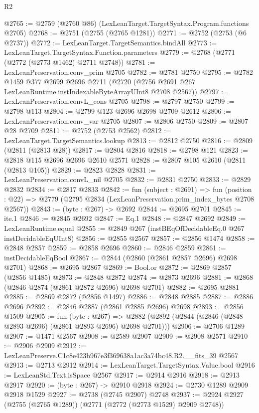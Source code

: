 \begin{lexlean}{R2}
\begin{coremodule}
@2765 := @2759 (@2760 @86) (LexLeanTarget.TargetSyntax.Program.functions @2705)
@2768 := @2751 (@2755 (@2765 @1281))
@2771 := @2752 (@2753 (@6 @2737))
@2772 := LexLeanTarget.TargetSemantics.bindAll
@2773 := LexLeanTarget.TargetSyntax.Function.parameters
@2779 := @2768 (@2771 (@2772 (@2773 @1462) @2711 @2748))
@2781 := LexLeanPreservation.conv_prim @2705
@2782 := @2781 @2750
@2795 := @2782
    @1459
    @377
    @2699
    @2696
    @2711
    (@2720 (@2756 @2691 @267 LexLeanRuntime.instIndexableByteArrayUInt8 @2708 @2567))
@2797 := LexLeanPreservation.convL_cons @2705
@2798 := @2797 @2750
@2799 := @2798 @113
@2804 := @2799 @123 @2696 @2698 @2709 @2612
@2806 := LexLeanPreservation.conv_var @2705
@2807 := @2806 @2750
@2809 := @2807 @28 @2709
@2811 := @2752 (@2753 @2562)
@2812 := LexLeanTarget.TargetSemantics.lookup
@2813 := @2812 @2750
@2816 := @2809 (@2811 (@2813 @28))
@2817 := @2804 @2816
@2818 := @2798 @121
@2823 := @2818 @115 @2696 @2696 @2610 @2571
@2828 := @2807 @105 @2610 (@2811 (@2813 @105))
@2829 := @2823 @2828
@2831 := LexLeanPreservation.convL_nil @2705
@2832 := @2831 @2750
@2833 := @2829 @2832
@2834 := @2817 @2833
@2842 := fun (subject : @2691) =>
  fun (position : @22) => @2779 (@2795 @2834 (LexLeanPreservation.prim_index_bytes @2708 @2567))
@2843 := (byte : @267) -> @2692
@2844 := @2695 @2701
@2845 := ite.{1}
@2846 := @2845 @2692
@2847 := Eq.{1}
@2848 := @2847 @2692
@2849 := LexLeanRuntime.equal
@2855 := @2849 @267 (instBEqOfDecidableEq.{0} @267 instDecidableEqUInt8)
@2856 := @2855 @2567
@2857 := @2856 @1474
@2858 := @2848 @2857
@2859 := @2858 @2696
@2860 := @2846 @2859
@2861 := instDecidableEqBool
@2867 := @2844 (@2860 (@2861 @2857 @2696) @2698 @2701)
@2868 := @2695 @2867
@2869 := Bool.or
@2872 := @2869 @2857 (@2856 @1485)
@2873 := @2848 @2872
@2874 := @2873 @2696
@2881 := @2868 (@2846 @2874 (@2861 @2872 @2696) @2698 @2701)
@2882 := @2695 @2881
@2885 := @2869 @2872 (@2856 @1497)
@2886 := @2848 @2885
@2887 := @2886 @2696
@2892 := @2846 @2887 (@2861 @2885 @2696) @2698
@2893 := @2856 @1509
@2905 := fun (byte : @267) =>
  @2882 (@2892 (@2844 (@2846 (@2848 @2893 @2696) (@2861 @2893 @2696) @2698 @2701)))
@2906 := @2706 @1289
@2907 := @1471 @2567
@2908 := @2589 @2907
@2909 := @2908 @2571
@2910 := @2906 @2909
@2912 := LexLeanPreserve.C1c8e423b967e3f369638a1ac3a74bc48.R2.__fits_39 @2567
@2913 := @2713 @2912
@2914 := LexLeanTarget.TargetSyntax.Value.bool
@2916 := LexLeanStd.Text.isSpace @2567
@2917 := @2914 @2916
@2918 := @2913 @2917
@2920 := (byte : @267) -> @2910 @2918
@2924 := @2730 @1289 @2909 @2918 @1529
@2927 := @2738 (@2745 @2907) @2748
@2937 := @2924 @2927 (@2755 (@2765 @1289)) (@2771 (@2772 (@2773 @1529) @2909 @2748))

\end{coremodule}
\end{lexlean}
